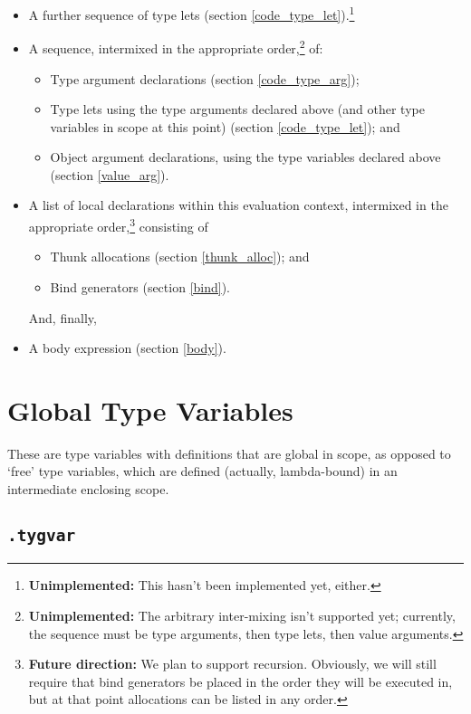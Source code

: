 \documentclass{report}
\newcommand\stringcode[1]{\texttt{#1}}
\newcommand\unimpl[1]{\footnote{\textbf{Unimplemented: }#1}}
\newcommand\future[1]{\footnote{\textbf{Future direction:} #1}}
\begin{document}
\begin{itemize}
    \item A further sequence of type lets (section \ref{code_type_let}).\unimpl{This hasn't been implemented yet, either.}
    \item A sequence, intermixed in the appropriate order,\unimpl{The arbitrary inter-mixing isn't supported yet; currently, the sequence must be type arguments, then type lets, then value arguments.} of:
        \begin{itemize}
            \item Type argument declarations (section \ref{code_type_arg});
            \item Type lets using the type arguments declared above (and other type variables in scope at this point) (section \ref{code_type_let}); and
            \item Object argument declarations, using the type variables declared above (section \ref{value_arg}).
        \end{itemize}
    \item A list of local declarations within this evaluation context,
        intermixed in the appropriate order,\future{We plan to support recursion.
            Obviously, we will still require that bind generators be placed in the order they will be executed in,
            but at that point allocations can be listed in any order.
        }
        consisting of
        \begin{itemize}
            \item Thunk allocations (section \ref{thunk_alloc}); and
            \item Bind generators (section \ref{bind}).
        \end{itemize}
        And, finally,
    \item A body expression (section \ref{body}).
\end{itemize}

\section{Global Type Variables}
\label{code_type_gvar}

These are type variables with definitions that are global in scope,
as opposed to `free' type variables, which are defined (actually, lambda-bound) in an intermediate enclosing scope.

\subsection{\stringcode{.tygvar}}
\end{document}
